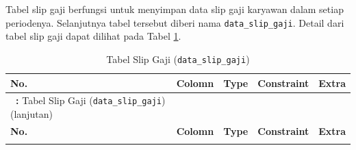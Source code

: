 \begin{enumerate}
			    Tabel slip gaji berfungsi untuk menyimpan data slip gaji karyawan dalam setiap periodenya. Selanjutnya tabel tersebut diberi nama \texttt{data\_slip\_gaji}. Detail dari tabel slip gaji dapat dilihat pada Tabel \ref{tabel_slip_gaji}.
			    \begin{spacing}{1.0}
		        \begin{longtable}{|>{\centering}p{1.5em}|p{3cm}|p{2.5cm}|p{3cm}|p{2.5cm}|}
			        \caption{Tabel Slip Gaji (\texttt{data\_slip\_gaji})} \label{tabel_slip_gaji} \\
                    \hline \textbf{No.} & \textbf{Colomn} & \textbf{Type} & \textbf{Constraint} & \textbf{Extra}  \\ \hline 
                    \endfirsthead
                    \multicolumn{5}{c}%
                    {{\bfseries \tablename\ \thetable{}: }Tabel Slip Gaji (\texttt{data\_slip\_gaji}) (lanjutan)} \\
                    \hline \textbf{No.} & \textbf{Colomn} & \textbf{Type} & \textbf{Constraint} & \textbf{Extra}  \\ \hline
                    \endhead
                    \hline
                    \endfoot
                    \hline \hline
                    \endlastfoot
                    

\end{longtable}
\end{spacing}
\end{enumerate}
